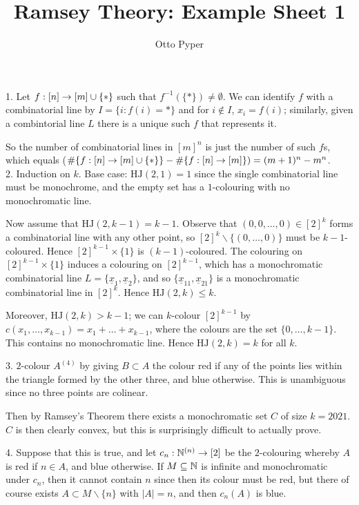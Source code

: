 \documentclass[10pt]{article}
\title{Ramsey Theory: Example Sheet 1}
\author{Otto Pyper}
\date{}
\newcommand{\hj}{\textrm{HJ}}
\begin{document}
\maketitle

1. Let $f : [n] \rightarrow [m]\cup\{\ast\}$ such that $f^{-1}(\{\ast\})\ne\emptyset$. We can identify $f$ with a combinatorial line by $I = \{i : f(i) = \ast\}$ and for $i\not\in I$, $x_i = f(i)$; similarly, given a combintorial line $L$ there is a unique such $f$ that represents it.

So the number of combinatorial lines in $[m]^n$ is just the number of such $f$s, which equals ($\#\{f:[n]\rightarrow [m]\cup\{\ast\}\} - \# \{f:[n]\rightarrow [m]\}) = (m+1)^n - m^n$.\ \\

2. Induction on $k$. Base case: $\hj(2,1) = 1$ since the single combinatorial line must be monochrome, and the empty set has a $1$-colouring with no monochromatic line.

Now assume that $\hj(2,k-1) = k-1$. Observe that $(0,0,\dots,0)\in [2]^k$ forms a combinatorial line with any other point, so $[2]^k \backslash \{(0,\dots,0)\}$ must be $k-1$-coloured. Hence $[2]^{k-1}\times\{1\}$ is $(k-1)$-coloured. The colouring on $[2]^{k-1}\times \{1\}$ induces a colouring on $[2]^{k-1}$, which has a monochromatic combinatorial line $L = \{\underline{x}_1,\underline{x}_2\}$, and so $\{\underline{x}_11,\underline{x}_21\}$ is a monochromatic combinatorial line in $[2]^{k}$. Hence $\hj(2,k) \le k$.

Moreover, $\hj(2,k) > k-1$; we can $k$-colour $[2]^{k-1}$ by $c(x_1,\dots,x_{k-1}) = x_1 + \dots + x_{k-1}$, where the colours are the set $\{0,\dots,k-1\}$. This contains no monochromatic line. Hence $\hj(2,k) = k$ for all $k$.

3. $2$-colour $A^{(4)}$ by giving $B\subset A$ the colour red if any of the points lies within the triangle formed by the other three, and blue otherwise. This is unambiguous since no three points are colinear.

Then by Ramsey's Theorem there exists a monochromatic set $C$ of size $k = 2021$. $C$ is then clearly convex, but this is surprisingly difficult to actually prove.

4. Suppose that this is true, and let $c_n : \mathbb{N}^{(n)}\rightarrow [2]$ be the $2$-colouring whereby $A$ is red if $n \in A$, and blue otherwise. If $M \subseteq \mathbb{N}$ is infinite and monochromatic under $c_n$, then it cannot contain $n$ since then its colour must be red, but there of course exists $A\subset M\backslash \{n\}$ with $|A| = n$, and then $c_n(A)$ is blue.
\end{document}
